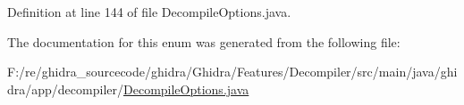 Definition at line 144 of file Decompile\+Options.\+java.



The documentation for this enum was generated from the following file\+:\begin{DoxyCompactItemize}
\item 
F\+:/re/ghidra\+\_\+sourcecode/ghidra/\+Ghidra/\+Features/\+Decompiler/src/main/java/ghidra/app/decompiler/\mbox{\hyperlink{_decompile_options_8java}{Decompile\+Options.\+java}}\end{DoxyCompactItemize}
